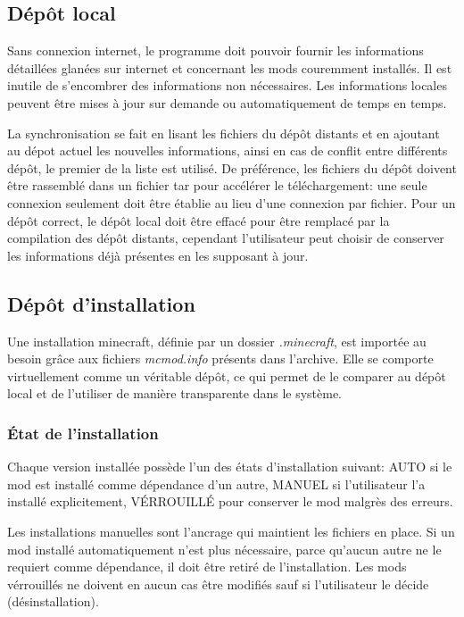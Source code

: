 \documentclass{article}
\begin{document}
\subsection{Dépôt local}
Sans connexion internet, le programme doit pouvoir fournir les informations détaillées glanées sur internet et concernant les mods couremment installés.
Il est inutile de s'encombrer des informations non nécessaires.
Les informations locales peuvent être mises à jour sur demande ou automatiquement de temps en temps.

La synchronisation se fait en lisant les fichiers du dépôt distants et en ajoutant au dépot actuel les nouvelles informations, ainsi en cas de conflit entre différents dépôt, le premier de la liste est utilisé.
De préférence, les fichiers du dépôt doivent être rassemblé dans un fichier tar pour accélérer le téléchargement: une seule connexion seulement doit être établie au lieu d'une connexion par fichier.
Pour un dépôt correct, le dépôt local doit être effacé pour être remplacé par la compilation des dépôt distants, cependant l'utilisateur peut choisir de conserver les informations déjà présentes en les supposant à jour.


\subsection{Dépôt d'installation}
\label{subsection:depot_installation}
Une installation minecraft, définie par un dossier \textit{.minecraft}, est importée au besoin grâce aux fichiers \textit{mcmod.info} présents dans l'archive.
Elle se comporte virtuellement comme un véritable dépôt, ce qui permet de le comparer au dépôt local et de l'utiliser de manière transparente dans le système.

\subsubsection{État de l'installation}
Chaque version installée possède l'un des états d'installation suivant: AUTO si le mod est installé comme dépendance d'un autre, MANUEL si l'utilisateur l'a installé explicitement, VÉRROUILLÉ pour conserver le mod malgrès des erreurs.

Les installations manuelles sont l'ancrage qui maintient les fichiers en place.
Si un mod installé automatiquement n'est plus nécessaire, parce qu'aucun autre ne le requiert comme dépendance, il doit être retiré de l'installation.
Les mods vérrouillés ne doivent en aucun cas être modifiés sauf si l'utilisateur le décide (désinstallation).
\end{document}

